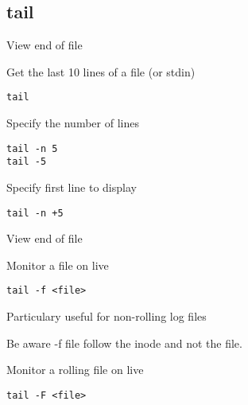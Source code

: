 \subsection{tail}

\begin{frame}[fragile]{View end of file}
  \begin{exampleblock}{Get the last 10 lines of a file (or stdin)}
    \begin{lstlisting}[showstringspaces=false,basicstyle=\tiny]
tail
    \end{lstlisting}
  \end{exampleblock}

  \pause
  \begin{exampleblock}{Specify the number of lines}
    \begin{lstlisting}[showstringspaces=false,basicstyle=\tiny]
tail -n 5
tail -5
    \end{lstlisting}
  \end{exampleblock}

  \pause
  \begin{exampleblock}{Specify first line to display}
    \begin{lstlisting}[showstringspaces=false,basicstyle=\tiny]
tail -n +5
    \end{lstlisting}
  \end{exampleblock}
\end{frame}


\begin{frame}[fragile]{View end of file}
  \begin{exampleblock}{Monitor a file on live}
    \begin{lstlisting}[showstringspaces=false,basicstyle=\tiny]
tail -f <file>
    \end{lstlisting}
  \end{exampleblock}
Particulary useful for non-rolling log files
\pause

Be aware -f file follow the inode and not the file.

  \pause
  \begin{exampleblock}{Monitor a rolling file on live}
    \begin{lstlisting}[showstringspaces=false,basicstyle=\tiny]
tail -F <file>
    \end{lstlisting}
  \end{exampleblock}


\end{frame}

